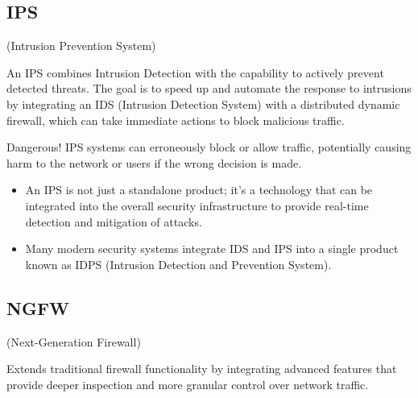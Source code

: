 \subsection{IPS}
\begin{center}
    (Intrusion Prevention System)
\end{center}

An IPS combines Intrusion Detection with the capability to actively prevent detected threats. The goal is to speed up and automate the response to intrusions by integrating an IDS (Intrusion Detection System) with a distributed dynamic firewall, which can take immediate actions to block malicious traffic.

\begin{tcolorbox}[colback=red!10!white, colframe=red!70!black, coltitle=white, title=Beware]
Dangerous! IPS systems can erroneously block or allow traffic, potentially causing harm to the network or users if the wrong decision is made.
\end{tcolorbox}

\begin{itemize}
    \item An IPS is not just a standalone product; it’s a technology that can be integrated into the overall security infrastructure to provide real-time detection and mitigation of attacks.
    \item Many modern security systems integrate IDS and IPS into a single product known as IDPS (Intrusion Detection and Prevention System).
\end{itemize}

\subsection{NGFW}
\begin{center}
    (Next-Generation Firewall)
\end{center}

Extends traditional firewall functionality by integrating advanced features that provide deeper inspection and more granular control over network traffic. 

